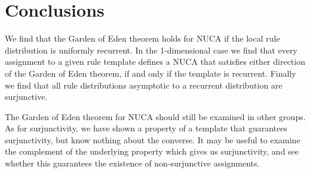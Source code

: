 \documentclass[runningheads]{llncs}
\newcommand{\Z}{\mathbb{Z}}
\begin{document}
\section{Conclusions}

We find that the Garden of Eden theorem holds for NUCA if the local rule distribution is uniformly recurrent. In the 1-dimensional case we find that every assignment to a given rule template defines a NUCA that satisfies either direction of the Garden of Eden theorem, if and only if the template is recurrent. Finally we find that all rule distributions asymptotic to a recurrent distribution are surjunctive.

The Garden of Eden theorem for NUCA should still be examined in other groups. As for surjunctivity, we have shown a property of a template that guarantees surjunctivity, but know nothing about the converse. It may be useful to examine the complement of the underlying property which gives us surjunctivity, and see whether this guarantees the existence of non-surjunctive assignments. 

%
%
%
\end{document}
